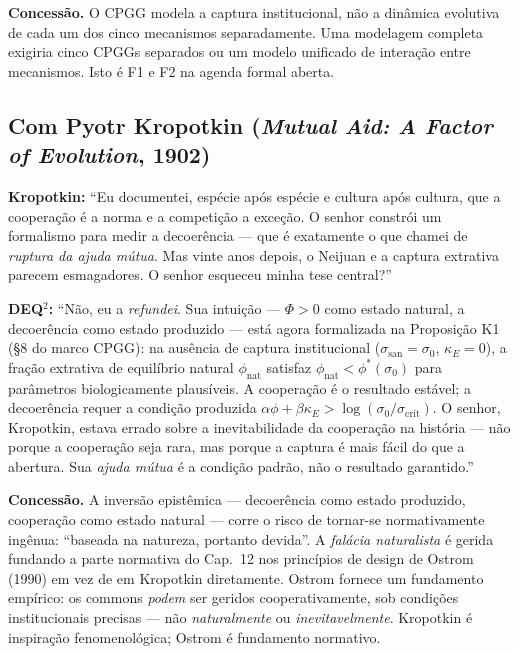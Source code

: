 \textbf{Concess\~{a}o.} O CPGG modela a captura institucional, n\~{a}o a
din\^{a}mica evolutiva de cada um dos cinco mecanismos separadamente. Uma
modelagem completa exigiria cinco CPGGs separados ou um modelo unificado
de intera\c{c}\~{a}o entre mecanismos. Isto \'{e} F1 e F2 na agenda
formal aberta.

\subsection{Com Pyotr Kropotkin (\emph{Mutual Aid: A Factor of
Evolution}, 1902)}\label{con-kropotkin-1902}

\textbf{Kropotkin:} ``Eu documentei, esp\'{e}cie ap\'{o}s esp\'{e}cie e
cultura ap\'{o}s cultura, que a coopera\c{c}\~{a}o \'{e} a norma e a
competi\c{c}\~{a}o a exce\c{c}\~{a}o. O senhor constr\'{o}i um formalismo
para medir a decoer\^{e}ncia --- que \'{e} exatamente o que chamei de
\emph{ruptura da ajuda m\'{u}tua}. Mas vinte anos depois, o Neijuan e a
captura extrativa parecem esmagadores. O senhor esqueceu minha tese
central?''

\textbf{DEQ$^2$:} ``N\~{a}o, eu a \emph{refundei}. Sua intui\c{c}\~{a}o
--- $\Phi > 0$ como estado natural, a decoer\^{e}ncia como estado produzido
--- est\'{a} agora formalizada na Proposi\c{c}\~{a}o K1 (§8 do marco
CPGG): na aus\^{e}ncia de captura institucional ($\sigma_{\text{san}} =
\sigma_0$, $\kappa_E = 0$), a fra\c{c}\~{a}o extrativa de equil\'{i}brio
natural $\phi_{\text{nat}}$ satisfaz $\phi_{\text{nat}} < \phi^*(\sigma_0)$
para par\^{a}metros biologicamente plaus\'{i}veis. A coopera\c{c}\~{a}o
\'{e} o resultado est\'{a}vel; a decoer\^{e}ncia requer a condi\c{c}\~{a}o
produzida $\alpha\phi + \beta\kappa_E > \log(\sigma_0/\sigma_{\text{crit}})$.
O senhor, Kropotkin, estava errado sobre a inevitabilidade da
coopera\c{c}\~{a}o na hist\'{o}ria --- n\~{a}o porque a coopera\c{c}\~{a}o
seja rara, mas porque a captura \'{e} mais f\'{a}cil do que a abertura.
Sua \emph{ajuda m\'{u}tua} \'{e} a condi\c{c}\~{a}o padr\~{a}o, n\~{a}o
o resultado garantido.''

\textbf{Concess\~{a}o.} A invers\~{a}o epist\^{e}mica --- decoer\^{e}ncia
como estado produzido, coopera\c{c}\~{a}o como estado natural --- corre o
risco de tornar-se normativamente ing\^{e}nua: ``baseada na natureza,
portanto devida''. A \emph{fal\'{a}cia naturalista} \'{e} gerida fundando
a parte normativa do Cap.~12 nos princ\'{i}pios de design de Ostrom (1990)
em vez de em Kropotkin diretamente. Ostrom fornece um fundamento
emp\'{i}rico: os commons \emph{podem} ser geridos cooperativamente, sob
condi\c{c}\~{o}es institucionais precisas --- n\~{a}o \emph{naturalmente}
ou \emph{inevitavelmente}. Kropotkin \'{e} inspira\c{c}\~{a}o
fenomenol\'{o}gica; Ostrom \'{e} fundamento normativo.




